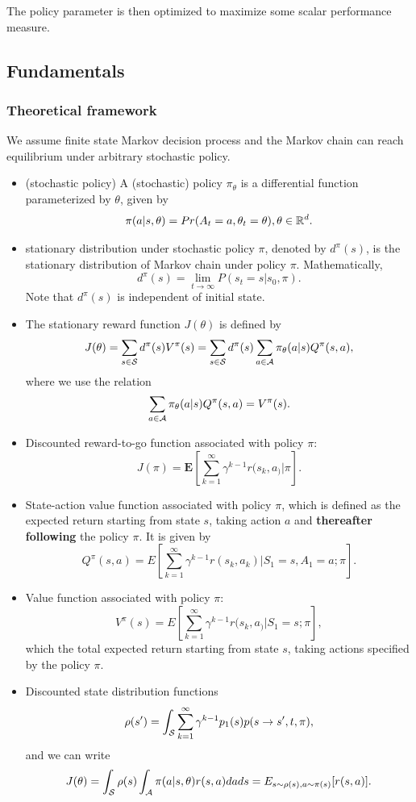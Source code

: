 \begin{refsection}
The policy parameter is then optimized to maximize some scalar performance measure.

\subsection{Fundamentals}
\subsubsection{Theoretical framework}
\begin{definition}
We assume finite state Markov decision process and the Markov chain can reach equilibrium under arbitrary stochastic policy. 	
	\begin{itemize}
		\item (stochastic policy) A (stochastic) policy $\pi_\theta$ is a differential function parameterized by $\theta$, given by
		$$\pi(a|s,\theta) = Pr(A_t = a, \theta_t = \theta), \theta\in \mathbb{R}^d.$$
		\item  stationary distribution under stochastic policy $\pi$, denoted by $d^\pi(s)$, is the stationary distribution of Markov chain under policy $\pi$. Mathematically, 
		$$d^\pi(s) = \lim_{t\to\infty} P(s_t = s|s_0, \pi).$$
		Note that $d^\pi(s)$ is independent of initial state.
		\item The stationary reward function $J(\theta)$ is defined by
		$$J(\theta) = \sum_{s\in \mathcal{S}} d^\pi(s) V^\pi(s) = \sum_{s\in \mathcal{S}} d^\pi(s) \sum_{a\in \mathcal{A}} \pi_\theta(a| s) Q^\pi(s, a),$$		
		where we use the relation
		$$\sum_{a\in \mathcal{A}} \pi_\theta(a| s) Q^\pi(s, a) = V^\pi(s).$$
		
		\item Discounted reward-to-go function associated with policy $\pi$:
		$$J(\pi) = \mathbf{E}[\sum_{k=1}^\infty \gamma^{k-1}r(s_k,a_)|\pi].$$
		\item State-action value function associated with policy $\pi$, which is defined as the expected return starting from state $s$, taking action $a$ and \textbf{thereafter following} the policy $\pi$. It is given by
		$$Q^\pi(s,a) = E[\sum_{k=1}^\infty \gamma^{k-1}r(s_k,a_k)|S_1=s,A_1=a;\pi].$$
		\item Value function associated with policy $\pi$:
		$$V^\pi(s) = E[\sum_{k=1}^\infty \gamma^{k-1}r(s_k,a_)|S_1=s;\pi],$$
		which the total expected return  starting from state $s$, taking actions specified by the policy $\pi$. 
		\item Discounted state distribution functions
		$$\rho(s') = \int_{\mathcal{S}} \sum_{k=1}^\infty \gamma^{k-1}p_1(s)p(s\to s',t,\pi),$$
		and we can write
		$$J(\theta) = \int_{\mathcal{S}} \rho(s)\int_{\mathcal{A}} \pi(a|s,\theta) r(s,a)dads = E_{s\sim \rho(s),a\sim\pi(s)}[r(s,a)].$$
	\end{itemize}
\end{definition}


\end{refsection}
